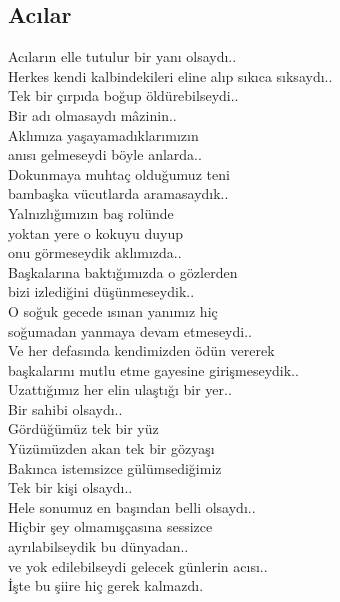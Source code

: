 \subsection{Acılar}

Acıların elle tutulur bir yanı olsaydı.. \\
Herkes kendi kalbindekileri eline alıp sıkıca sıksaydı.. \\
Tek bir çırpıda boğup öldürebilseydi.. \\
Bir adı olmasaydı mâzinin.. \\
Aklımıza yaşayamadıklarımızın \\
anısı gelmeseydi böyle anlarda.. \\
Dokunmaya muhtaç olduğumuz teni \\
bambaşka vücutlarda aramasaydık.. \\
Yalnızlığımızın baş rolünde \\
yoktan yere o kokuyu duyup \\
onu görmeseydik aklımızda.. \\
Başkalarına baktığımızda o gözlerden \\
bizi izlediğini düşünmeseydik.. \\
O soğuk gecede ısınan yanımız hiç \\
soğumadan yanmaya devam etmeseydi.. \\
Ve her defasında kendimizden ödün vererek \\
başkalarını mutlu etme gayesine girişmeseydik.. \\
Uzattığımız her elin ulaştığı bir yer.. \\
Bir sahibi olsaydı.. \\
Gördüğümüz tek bir yüz \\
Yüzümüzden akan tek bir gözyaşı \\
Bakınca istemsizce gülümsediğimiz \\
Tek bir kişi olsaydı.. \\
Hele sonumuz en başından belli olsaydı.. \\
Hiçbir şey olmamışçasına sessizce \\
ayrılabilseydik bu dünyadan.. \\
ve yok edilebilseydi gelecek günlerin acısı.. \\
İşte bu şiire hiç gerek kalmazdı. \\